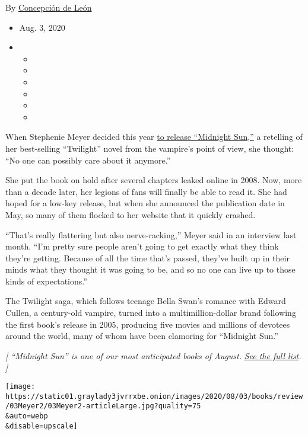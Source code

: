 By
\href{https://www.nytimes3xbfgragh.onion/by/concepcion-de-leon}{Concepción
de León}

\begin{itemize}
\item
  Aug. 3, 2020
\item
  \begin{itemize}
  \item
  \item
  \item
  \item
  \item
  \item
  \end{itemize}
\end{itemize}

When Stephenie Meyer decided this year
\href{https://www.nytimes3xbfgragh.onion/2020/05/04/books/stephenie-meyer-midnight-sun-twilight.html}{to
release ``Midnight Sun,''} a retelling of her best-selling ``Twilight''
novel from the vampire's point of view, she thought: ``No one can
possibly care about it anymore.''

She put the book on hold after several chapters leaked online in 2008.
Now, more than a decade later, her legions of fans will finally be able
to read it. She had hoped for a low-key release, but when she announced
the publication date in May, so many of them flocked to her website that
it quickly crashed.

``That's really flattering but also nerve-racking,'' Meyer said in an
interview last month. ``I'm pretty sure people aren't going to get
exactly what they think they're getting. Because of all the time that's
passed, they've built up in their minds what they thought it was going
to be, and so no one can live up to those kinds of expectations.''

The Twilight saga, which follows teenage Bella Swan's romance with
Edward Cullen, a century-old vampire, turned into a multimillion-dollar
brand following the first book's release in 2005, producing five movies
and millions of devotees around the world, many of whom have been
clamoring for ``Midnight Sun.''

\emph{{[} ``Midnight Sun'' is one of our most anticipated books of
August.}
\href{https://www.nytimes3xbfgragh.onion/2020/07/30/books/new-august-books.html}{\emph{See
the full list}}\emph{. {]}}

\texttt{[image: https://static01.graylady3jvrrxbe.onion/images/2020/08/03/books/review/03Meyer2/03Meyer2-articleLarge.jpg?quality=75\\\&auto=webp\\\&disable=upscale]}

